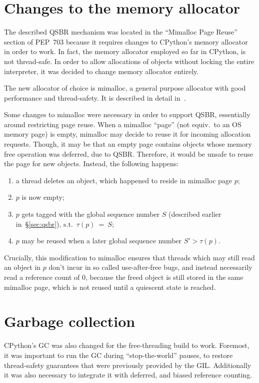 \section{Changes to the memory allocator}\label{sec:mimalloc}

The described QSBR mechanism was located in the ``Mimalloc Page Reuse'' section of PEP~703 because it requires changes to CPython's memory allocator in order to work.
In fact, the memory allocator employed so far in CPython, is not thread-safe.
In order to allow allocations of objects without locking the entire interpreter, it was decided to change memory allocator entirely.

The new allocator of choice is mimalloc, a general purpose allocator with good performance and thread-safety.
It is described in detail in~\cite{mimalloc}.

Some changes to mimalloc were necessary in order to support QSBR, essentially around restricting page reuse.
When a mimalloc ``page'' (not equiv.\ to an OS memory page) is empty, mimalloc may decide to reuse it for incoming allocation requests.
Though, it may be that an empty page contains objects whose memory free operation was deferred, due to QSBR\@.
Therefore, it would be unsafe to reuse the page for new objects.
Instead, the following happens:
\begin{enumerate}
    \item a thread deletes an object, which happened to reside in mimalloc page $p$;
    \item $p$ is now empty;
    \item $p$ gets tagged with the global sequence number $S$ (described earlier in~\S\ref{sec:qsbr}), s.t.\ $\tau(p)~=~S$;
    \item $p$ may be reused when a later global sequence number $S' > \tau(p)$.
\end{enumerate}

Crucially, this modification to mimalloc ensures that threads which may still read an object in $p$ don't incur in so called use-after-free bugs, and instead necessarily read a reference count of 0, because the freed object is still stored in the same mimalloc page, which is not reused until a quiescent state is reached.


\section{Garbage collection}\label{sec:python-gc}

CPython's GC was also changed for the free-threading build to work.
Foremost, it was important to run the GC during ``stop-the-world'' pauses, to restore thread-safety guarantees that were previously provided by the GIL\@.
Additionally it was also necessary to integrate it with deferred, and biased reference counting.

